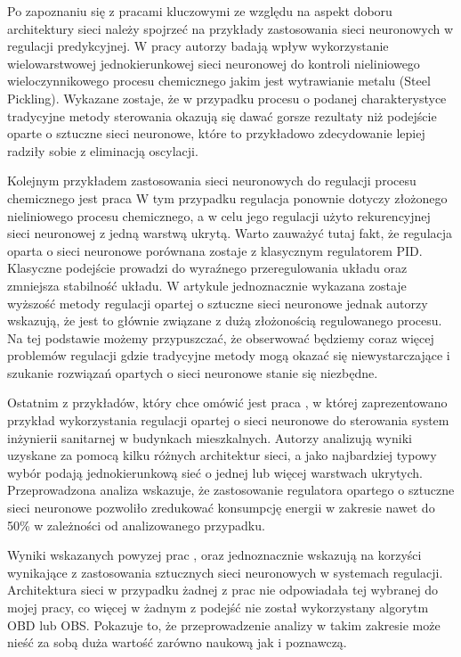\par Po zapoznaniu się z pracami kluczowymi ze względu na aspekt doboru architektury sieci należy spojrzeć na przykłady zastosowania sieci neuronowych w regulacji predykcyjnej. W pracy \cite{kiti2009} autorzy badają wpływ wykorzystanie wielowarstwowej jednokierunkowej sieci neuronowej do kontroli nieliniowego wieloczynnikowego procesu chemicznego jakim jest wytrawianie metalu (Steel Pickling). Wykazane zostaje, że w przypadku procesu o podanej charakterystyce tradycyjne metody sterowania okazują się dawać gorsze rezultaty niż podejście oparte o sztuczne sieci neuronowe, które to przykładowo zdecydowanie lepiej radziły sobie z eliminacją oscylacji. 
\par Kolejnym przykładem zastosowania sieci neuronowych do regulacji procesu chemicznego jest praca \cite{hosen2011} W tym przypadku regulacja ponownie dotyczy złożonego nieliniowego procesu chemicznego, a w celu jego regulacji użyto rekurencyjnej sieci neuronowej z jedną warstwą ukrytą. Warto zauważyć tutaj fakt, że regulacja oparta o sieci neuronowe porównana zostaje z klasycznym regulatorem PID. Klasyczne podejście prowadzi do wyraźnego przeregulowania  układu oraz zmniejsza stabilność układu. W artykule jednoznacznie wykazana zostaje wyższość metody regulacji opartej o sztuczne sieci
neuronowe jednak autorzy wskazują, że jest to głównie związane z dużą złożonością regulowanego procesu. Na tej podstawie możemy przypuszczać, że obserwować będziemy coraz więcej problemów regulacji gdzie tradycyjne metody mogą okazać się niewystarczające i szukanie rozwiązań opartych o sieci neuronowe stanie się niezbędne. 
\par Ostatnim z przykładów, który chce omówić jest praca \cite{afram2017}, w której zaprezentowano przykład wykorzystania regulacji opartej o sieci neuronowe do sterowania system inżynierii sanitarnej w budynkach mieszkalnych. Autorzy analizują wyniki uzyskane za pomocą kilku różnych architektur sieci, a jako najbardziej typowy wybór podają jednokierunkową sieć o jednej lub więcej warstwach ukrytych. Przeprowadzona analiza wskazuje, że zastosowanie regulatora opartego o sztuczne sieci neuronowe pozwoliło zredukować konsumpcję energii w zakresie nawet do 50\% w zależności od analizowanego przypadku.

\par Wyniki wskazanych powyzej prac \cite{kiti2009}, \cite{hosen2011} oraz \cite{afram2017} jednoznacznie wskazują na korzyści wynikające z zastosowania sztucznych sieci neuronowych w systemach regulacji. Architektura sieci w przypadku żadnej z prac nie odpowiadała tej wybranej do mojej pracy, co więcej w żadnym z podejść nie został wykorzystany algorytm OBD lub OBS. Pokazuje to, że przeprowadzenie analizy w takim zakresie może nieść za sobą duża wartość zarówno naukową jak i poznawczą. 



